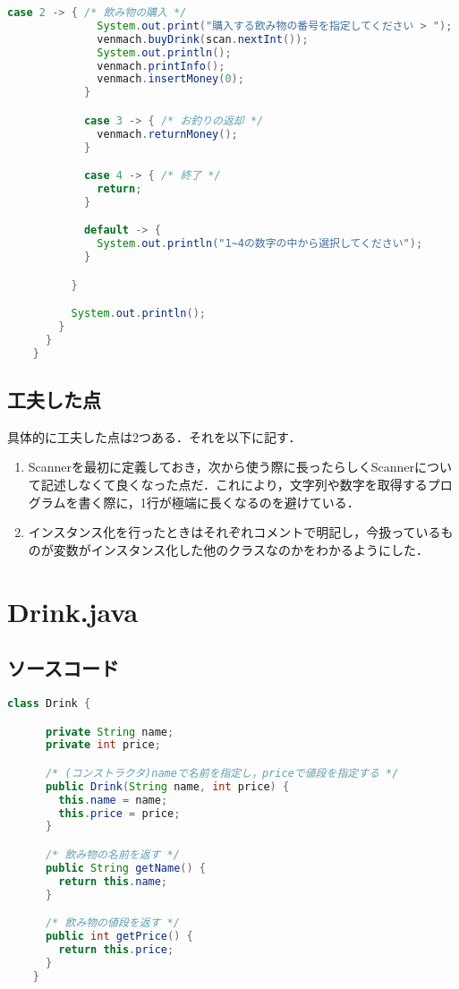 \documentclass{jlreq}
\begin{document}
\begin{lstlisting}[caption=Study02.java, label=code:in, language=Java]
            case 2 -> { /* 飲み物の購入 */
              System.out.print("購入する飲み物の番号を指定してください > ");
              venmach.buyDrink(scan.nextInt());
              System.out.println();
              venmach.printInfo();
              venmach.insertMoney(0);
            }

            case 3 -> { /* お釣りの返却 */
              venmach.returnMoney();
            }

            case 4 -> { /* 終了 */
              return;
            }

            default -> {
              System.out.println("1~4の数字の中から選択してください");
            }

          }

          System.out.println();
        }
      }
    }
  \end{lstlisting}

  \subsection{工夫した点}
  具体的に工夫した点は2つある．それを以下に記す．
  \begin{enumerate}[(1). ]
    \item Scannerを最初に定義しておき，次から使う際に長ったらしくScannerについて記述しなくて良くなった点だ．これにより，文字列や数字を取得するプログラムを書く際に，1行が極端に長くなるのを避けている．
    \item インスタンス化を行ったときはそれぞれコメントで明記し，今扱っているものが変数がインスタンス化した他のクラスなのかをわかるようにした．
  \end{enumerate}

  \newpage

  \section{Drink.java}

  \subsection{ソースコード}

  \begin{lstlisting}[caption=Drink.java, label=code:in, language=Java]
    class Drink {

      private String name;
      private int price;

      /* (コンストラクタ)nameで名前を指定し，priceで値段を指定する */
      public Drink(String name, int price) {
        this.name = name;
        this.price = price;
      }

      /* 飲み物の名前を返す */
      public String getName() {
        return this.name;
      }

      /* 飲み物の値段を返す */
      public int getPrice() {
        return this.price;
      }
    }
  \end{lstlisting}
\end{document}

